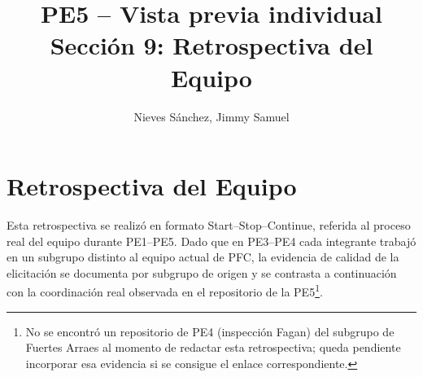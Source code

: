 \documentclass[12pt,a4paper]{article}
\title{PE5 -- Vista previa individual\\Sección 9: Retrospectiva del Equipo}
\author{Nieves Sánchez, Jimmy Samuel}
\date{}
\begin{document}
\maketitle


\section{Retrospectiva del Equipo}

Esta retrospectiva se realizó en formato Start--Stop--Continue, referida al
proceso real del equipo durante PE1--PE5. Dado que en PE3--PE4 cada
integrante trabajó en un subgrupo distinto al equipo actual de PFC, la
evidencia de calidad de la elicitación se documenta por subgrupo de origen
y se contrasta a continuación con la coordinación real observada en el
repositorio de la PE5\footnote{No se encontró un repositorio de PE4
(inspección Fagan) del subgrupo de Fuertes Arraes al momento de redactar
esta retrospectiva; queda pendiente incorporar esa evidencia si se
consigue el enlace correspondiente.}.
\end{document}

